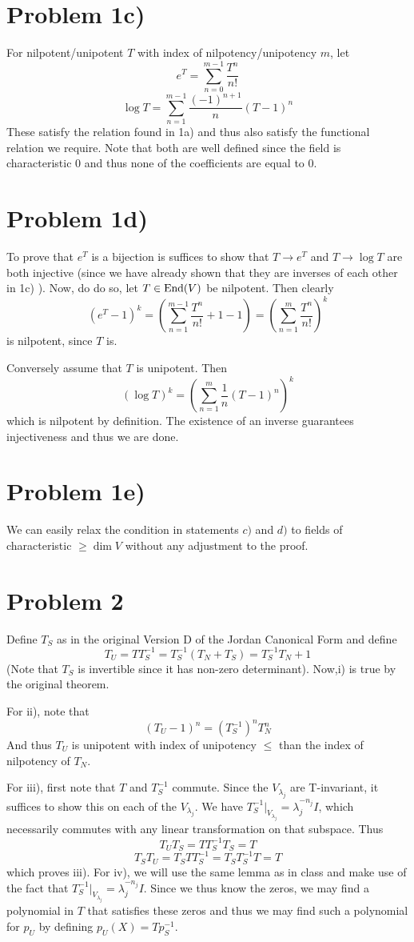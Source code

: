 \section*{Problem 1c)}
For nilpotent/unipotent $T$ with index of nilpotency/unipotency $m$, let 
\[ e^T = \sum_{n=0}^{m-1} \frac{T^n}{n!} \]
\[ \log T = \sum_{n=1}^{m-1} \frac{(-1)^{n+1}}{n} (T-1)^n \]
These satisfy the relation found in 1a) and thus also satisfy the functional relation we require. Note that both are well defined since the field is characteristic $0$ and thus none of the coefficients are equal to $0$.
\section*{Problem 1d)}
To prove that $e^T$ is a bijection is suffices to show that $T\to e^T$ and $T\to \log T$ are both injective (since we have already shown that they are inverses of each other in 1c) ). Now, do do so, let $T\in \text{End}(V)$ be nilpotent. Then clearly
\[ (e^T - 1)^k = (\sum_{n=1}^{m-1} \frac{T^n}{n!} + 1 - 1) = \left(\sum_{n=1}^m \frac{T^n}{n!}\right)^k \]
is nilpotent, since $T$ is. \par
Conversely assume that $T$ is unipotent. Then
\[ (\log T)^k = (\sum_{n=1}^m \frac{1}{n} (T-1)^n)^k \]
which is nilpotent by definition. The existence of an inverse guarantees injectiveness and thus we are done.
\section*{Problem 1e)}
We can easily relax the condition in statements $c)$ and $d)$ to fields of characteristic $\geq \dim V$ without any adjustment to the proof.
\section*{Problem 2}
Define $T_S$ as in the original Version D of the Jordan Canonical Form and define
\[ T_U = TT_S^{-1} = T_S^{-1}(T_N+T_S) = T_S^{-1}T_N + 1 \]
(Note that $T_S$ is invertible since it has non-zero determinant).
Now,i) is true by the original theorem. \par
For ii), note that
\[ (T_U-1)^n = \left(T_S^{-1}\right)^nT_N^n\]
And thus $T_U$ is unipotent with index of unipotency $\leq$ than the index of nilpotency of $T_N$. \par
For iii), first note that $T$ and $T_S^{-1}$ commute. Since the $V_{\lambda_j}$ are T-invariant, it suffices to show this on each of the $V_{\lambda_j}$. We have $T_S^{-1}|_{V_{\lambda_j}} = \lambda_j^{-n_j} I$, which necessarily commutes with any linear transformation on that subspace.
Thus 
\[ T_UT_S = TT_S^{-1}T_S = T \]
\[ T_ST_U = T_STT_S^{-1} = T_ST_S^{-1}T = T \]
which proves iii).
For iv), we will use the same lemma as in class and make use of the fact that $T_S^{-1}|_{V_{\lambda_j}} = \lambda_j^{-n_j} I$. Since we thus know the zeros, we may find a polynomial in $T$ that satisfies these zeros and thus we may find such a polynomial for $p_U$ by defining $p_U(X) = Tp_S^{-1}$. 
